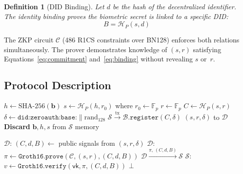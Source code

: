 \documentclass[journal, letterpaper, 10pt]{IEEEtran}
\newtheorem{definition}{Definition}
\begin{document}
\begin{definition}[DID Binding]
\label{def:binding}
Let $d$ be the hash of the decentralized identifier. The identity binding proves the biometric secret is linked to a specific DID:
\begin{equation}
  B = \mathcal{H}_P(s, d)
  \label{eq:binding}
\end{equation}
\end{definition}

The ZKP circuit $\mathcal{C}$ (486 R1CS constraints over BN128) enforces both relations simultaneously. The prover demonstrates knowledge of $(s, r)$ satisfying Equations~\ref{eq:commitment} and~\ref{eq:binding} without revealing $s$ or~$r$.

\subsection{Protocol Description}

\begin{algorithm}[h]
\caption{Identity Registration}
\label{alg:registration}
$h \leftarrow \text{SHA-256}(\mathbf{b})$
$s \leftarrow \mathcal{H}_P(h, r_0)$ where $r_0 \leftarrow \mathbb{F}_p$\;
$r \leftarrow \mathbb{F}_p$
$C \leftarrow \mathcal{H}_P(s, r)$
$\delta \leftarrow \texttt{did:zeroauth:base:}\|\text{rand}_{128}$\;
$\mathcal{S} \xrightarrow{\text{tx}} \mathcal{B}.\texttt{register}(C, \delta)$\;
\Return $(s, r, \delta)$ to $\mathcal{D}$\;
\textbf{Discard} $\mathbf{b}, h, s$ from $\mathcal{S}$ memory\;
\end{algorithm}

\begin{algorithm}[h]
\caption{Zero-Knowledge Authentication}
\label{alg:authentication}
$\mathcal{D}$: $(C, d, B) \leftarrow$ public signals from $(s, r, \delta)$\;
$\mathcal{D}$: $\pi \leftarrow \texttt{Groth16.prove}(\mathcal{C}, (s, r), (C, d, B))$\;
$\mathcal{D} \xrightarrow{\pi,\, (C, d, B)} \mathcal{S}$\;
$\mathcal{S}$: $v \leftarrow \texttt{Groth16.verify}(\mathsf{vk}, \pi, (C, d, B))$\;
\Return $\bot$\;
\end{algorithm}
\end{document}
